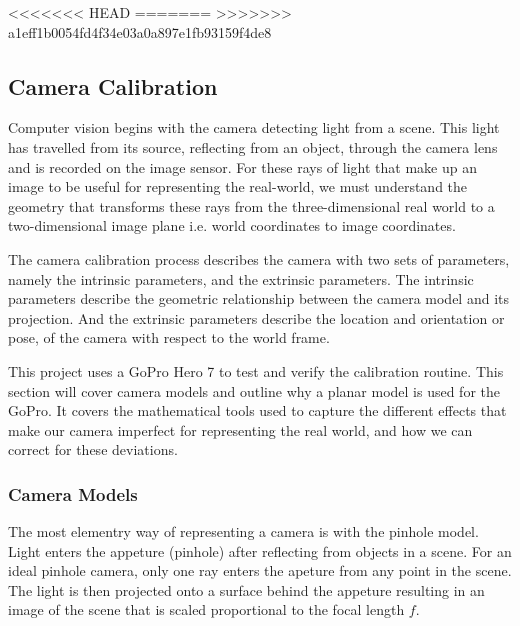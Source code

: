 \documentclass{UoNMCHA}
\numberwithin{equation}{section}
\begin{document}
<<<<<<< HEAD
=======
\newpage
>>>>>>> a1eff1b0054fd4f34e03a0a897e1fb93159f4de8
\subsection{Camera Calibration} %
Computer vision begins with the camera detecting light from a scene. This light has travelled from its source, reflecting from an object, through the camera lens and is recorded on the image sensor. For these rays of light that make up an image to be useful for representing the real-world, we must understand the geometry that transforms these rays from the three-dimensional real world to a two-dimensional image plane i.e. world coordinates to image coordinates.

The camera calibration process describes the camera with two sets of parameters, namely the intrinsic parameters, and the extrinsic parameters. The intrinsic parameters describe the geometric relationship between the camera model and its projection. And the extrinsic parameters describe the location and orientation or pose, of the camera with respect to the world frame.

This project uses a GoPro Hero 7 to test and verify the calibration routine. This section will cover camera models and outline why a planar model is used for the GoPro. It covers the mathematical tools used to capture the different effects that make our camera imperfect for representing the real world, and how we can correct for these deviations.
\subsubsection{Camera Models}
The most elementry way of representing a camera is with the pinhole model. Light enters the appeture (pinhole) after reflecting from objects in a scene. For an ideal pinhole camera, only one ray enters the apeture from any point in the scene. The light is then projected onto a surface behind the appeture resulting in an image of the scene that is scaled proportional to the focal length $f$.
\end{document}
